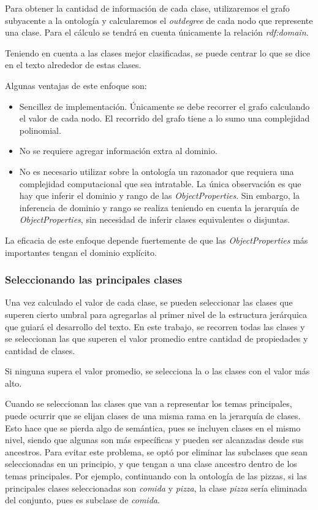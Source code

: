 Para obtener la cantidad de información de cada clase, utilizaremos el grafo subyacente a la ontología y calcularemos el \emph{outdegree} de cada nodo que represente una clase. Para el cálculo se tendrá en cuenta únicamente la relación \emph{rdf:domain}.

Teniendo en cuenta a las clases mejor clasificadas, se puede centrar lo que se dice en el texto alrededor de estas clases.

Algunas ventajas de este enfoque son:
\begin{itemize}
    \item Sencillez de implementación. Únicamente se debe recorrer el grafo calculando el valor de cada nodo. El recorrido del grafo tiene a lo sumo una complejidad polinomial.
    \item No se requiere agregar información extra al dominio.
    \item No es necesario utilizar sobre la ontología un razonador que requiera una complejidad computacional que sea intratable. La única observación es que hay que inferir el dominio y rango de las \emph{ObjectProperties}. Sin embargo, la inferencia de dominio y rango se realiza teniendo en cuenta la jerarquía de \emph{ObjectProperties}, sin necesidad de inferir clases equivalentes o disjuntas.
\end{itemize}

La eficacia de este enfoque depende fuertemente de que las \emph{ObjectProperties} más importantes tengan el dominio explícito.


\subsubsection{Seleccionando las principales clases}
\label{sec:select_class}
Una vez calculado el valor de cada clase, se pueden seleccionar las clases que superen cierto umbral para agregarlas al primer nivel de la estructura jerárquica que guiará el desarrollo del texto. En este trabajo, se recorren todas las clases y se seleccionan las que superen el valor promedio entre cantidad de propiedades y cantidad de clases.

Si ninguna supera el valor promedio, se selecciona la o las clases con el valor más alto.

Cuando se seleccionan las clases que van a representar los temas principales, puede ocurrir que se elijan clases de una misma rama en la jerarquía de clases. Esto hace que se pierda algo de semántica, pues se incluyen clases en el mismo nivel, siendo que algunas son más específicas y pueden ser alcanzadas desde sus ancestros. Para evitar este problema, se optó por eliminar las subclases que sean seleccionadas en un principio, y que tengan a una clase ancestro dentro de los temas principales. Por ejemplo, continuando con la ontología de las pizzas, si las principales clases seleccionadas son \emph{comida} y \emph{pizza}, la clase \emph{pizza} sería eliminada del conjunto, pues es subclase de \emph{comida}. 

